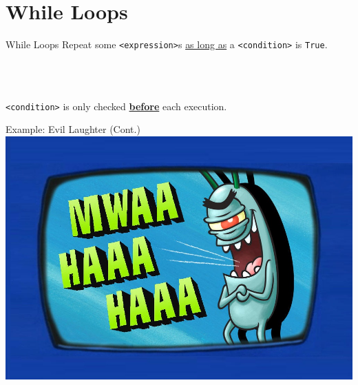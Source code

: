     \section{While Loops}
        \begin{frame}{While Loops}
            \pause
            Repeat some \texttt{<expression>}s \underline{as long as} a \texttt{<condition>} is \texttt{True}.
            \pause
            \begin{columns}
                \begin{column}{0.45\textwidth}
                    \inputminted[frame=single,framesep=2pt]{python3}{code-examples/while1.py}
                \end{column}
            \pause 
                \begin{column}{0.45\textwidth}
                    \inputminted[frame=single,framesep=2pt]{python3}{code-examples/while2.py}
                \end{column} 
            \end{columns}
            \pause
            \LARGE
            \inputminted[frame=single,framesep=2pt]{python3}{code-examples/while3.py}
            \pause
            \texttt{<condition>} is only checked \textbf{\underline{before}} each execution.
        \end{frame}

        \begin{frame}{Example: Evil Laughter (Cont.)}
            \centering
            \includegraphics[height=0.8\textheight]{images/evil_laugh.jpg}
        \end{frame}

   

